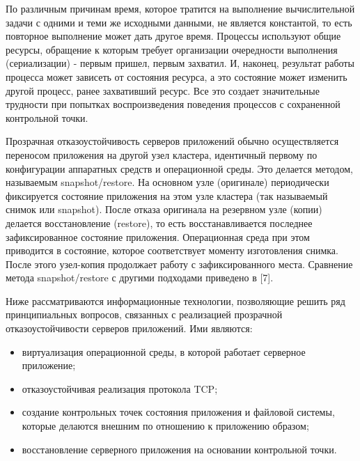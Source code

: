 \begin{multicols}{2}
По различным  причинам время, которое тратится на выполнение вычислительной задачи с одними и теми же исходными данными, не является константой, то есть повторное выполнение может дать другое время. Процессы используют общие ресурсы, обращение к которым требует организации очередности выполнения (сериализации) - первым пришел, первым захватил. И, наконец,  результат работы процесса может зависеть от состояния ресурса, а это состояние может изменить другой процесс, ранее захвативший ресурс. Все это создает значительные трудности при попытках воспроизведения поведения процессов с сохраненной контрольной точки.

Прозрачная отказоустойчивость серверов приложений обычно осуществляется переносом приложения на другой узел кластера, идентичный первому по конфигурации аппаратных средств и операционной среды. Это делается методом, называемым snapshot/restore. На основном узле (оригинале)  периодически фиксируется состояние приложения на этом узле кластера (так называемый снимок или snapshot). После отказа оригинала на резервном узле (копии) делается восстановление (restore), то есть восстанавливается последнее зафиксированное состояние приложения. Операционная среда при этом приводится в состояние, которое соответствует моменту изготовления снимка. После этого узел-копия продолжает работу с зафиксированного места. Сравнение метода  snapshot/restore с другими подходами приведено в [7].

Ниже рассматриваются информационные  технологии, позволяющие решить ряд принципиальных вопросов, связанных с реализацией прозрачной отказоустойчивости серверов приложений. Ими являются:
\begin{itemize}
\item виртуализация операционной среды, в которой работает серверное приложение;
\item отказоустойчивая реализация протокола TCP;
\item создание контрольных точек состояния приложения и файловой системы, которые делаются внешним по отношению к приложению образом;
\item восстановление серверного приложения на основании контрольной точки.
\end{itemize}
\begin{figure*} %
\vspace*{1pt}
\begin{center}
\mbox{%
\epsfxsize=1.6in
\epsfxsize=100mm
}
\end{center}
\vspace*{-9pt}
\vspace*{-3pt}
\end{figure*}


\end{multicols}
